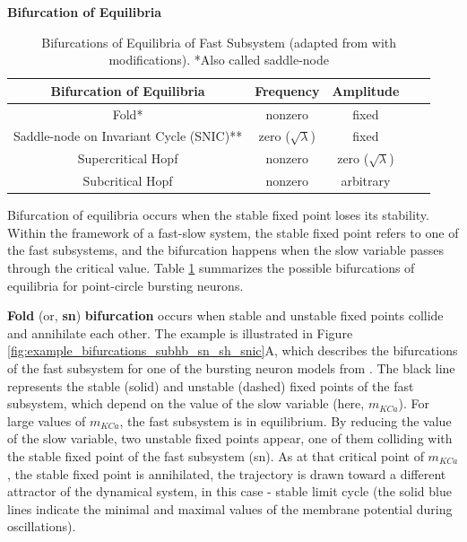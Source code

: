 \documentclass[../main.tex]{subfiles}
\begin{document}
\vspace*{0.3cm}
\noindent\textbf{Bifurcation of Equilibria}

\begin{table}[t!]
    \centering
    \begin{tabular}{|c||c|c|c|c|}
        \hline
        Bifurcation of Equilibria & Frequency & Amplitude \\ 
        \hline
        \hline
        Fold* & nonzero & fixed  \\
        Saddle-node on Invariant Cycle (SNIC)** & zero ($\sqrt{\lambda}$) & fixed \\
        Supercritical Hopf & nonzero & zero ($\sqrt{\lambda}$) \\
        Subcritical Hopf & nonzero & arbitrary \\
        \hline
    \end{tabular}
    \caption[Bifurcations of Equilibria of Fast Subsystem]{Bifurcations of Equilibria of Fast Subsystem
    (adapted from \parencite{izhikevichNEURALEXCITABILITYSPIKING2000} with modifications). *Also called saddle-node}
    \label{tab:bifurcations_equilibria}
\end{table}

Bifurcation of equilibria occurs when the stable fixed point loses its stability. Within the framework of a fast-slow system, the stable fixed point refers to one of the fast subsystems,
and the bifurcation happens when the slow variable passes through the critical value. Table \ref{tab:bifurcations_equilibria} summarizes the possible bifurcations of equilibria for point-circle bursting neurons.

\textbf{Fold} (or, \textbf{\gls{sn}}) \textbf{bifurcation} occurs when stable and unstable fixed points collide and annihilate each other. The example is illustrated in Figure \ref{fig:example_bifurcations_subhb_sn_sh_snic}A, which describes the bifurcations of the fast subsystem for one of the bursting neuron models from \parencite{franciRobustTunableBursting2018}. The black line represents the stable (solid) and unstable (dashed) fixed points of the fast subsystem, which depend on the value of the slow variable (here, $m_{KCa}$). For large values of $m_{KCa}$, the fast subsystem is in equilibrium. By reducing the value of the slow variable, two unstable fixed points appear, one of them colliding with the stable fixed point of the fast subsystem (\gls{sn}). As at that critical point of $m_{KCa}$, the stable fixed point is annihilated, the trajectory is drawn toward a different attractor of the dynamical system, in this case - stable limit cycle (the solid blue lines indicate the minimal and maximal values of the membrane potential during oscillations).
\end{document}
